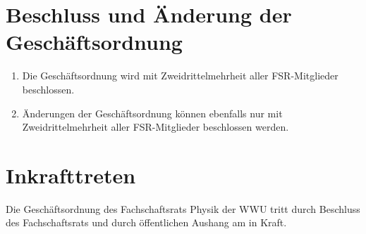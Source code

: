 \documentclass[
	a4paper,
	12pt,
	oneside,
	parskip=half-,
	pagesize,
	headsepline,
	german,
	ngerman
]{scrartcl}
\begin{document}
\section{Beschluss und Änderung der Geschäftsordnung} \label{sec:GO-Änderung}
\begin{enumerate}
	\item Die Geschäftsordnung wird mit Zweidrittelmehrheit aller FSR-Mitglieder beschlossen.
	\item Änderungen der Geschäftsordnung können ebenfalls nur mit Zweidrittelmehrheit aller FSR-Mitglieder beschlossen werden.
\end{enumerate}

\section{Inkrafttreten}
Die Geschäftsordnung des Fachschaftsrats Physik der WWU tritt durch Beschluss des Fachschaftsrats und durch öffentlichen Aushang am  in Kraft.
\end{document}
